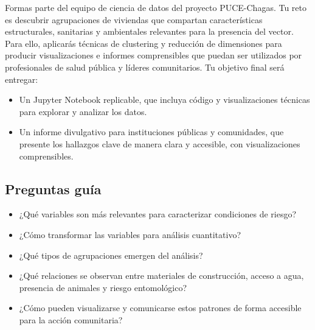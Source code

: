 \documentclass[a4,11pt]{aleph-notas}
\begin{document}
Formas parte del equipo de ciencia de datos del proyecto PUCE-Chagas. Tu reto es descubrir agrupaciones de viviendas que compartan características estructurales, sanitarias y ambientales relevantes para la presencia del vector. Para ello, aplicarás técnicas de clustering y reducción de dimensiones para producir visualizaciones e informes comprensibles que puedan ser utilizados por profesionales de salud pública y líderes comunitarios. Tu objetivo final será entregar:
\begin{itemize}[leftmargin=*]
\item Un Jupyter Notebook replicable, que incluya código y visualizaciones técnicas para explorar y analizar los datos.
\item Un informe divulgativo para instituciones públicas y comunidades, que presente los hallazgos clave de manera clara y accesible, con visualizaciones comprensibles.
\end{itemize}

\subsection*{Preguntas guía}  
\begin{itemize}[leftmargin=*]
\item ¿Qué variables son más relevantes para caracterizar condiciones de riesgo?
\item ¿Cómo transformar las variables para análisis cuantitativo?
\item ¿Qué tipos de agrupaciones emergen del análisis?
\item ¿Qué relaciones se observan entre materiales de construcción, acceso a agua, presencia de animales y riesgo entomológico?
\item ¿Cómo pueden visualizarse y comunicarse estos patrones de forma accesible para la acción comunitaria?
\end{itemize}
\end{document}
